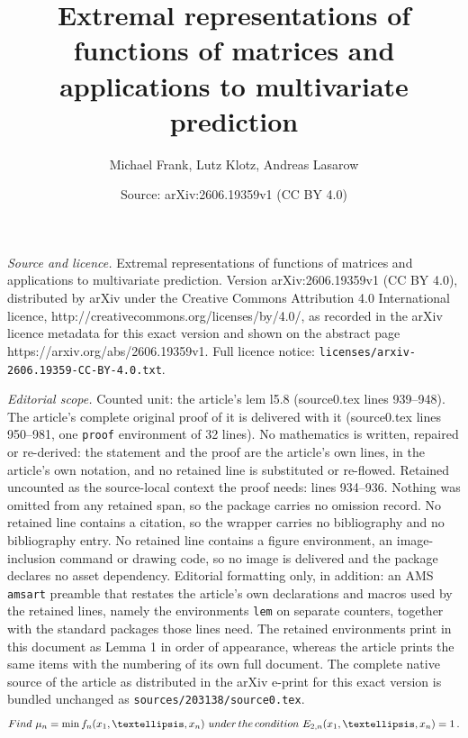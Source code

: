 \documentclass[10pt,a4paper]{amsart}
\title{Extremal representations of functions of matrices and applications to multivariate prediction}
\author{Michael Frank, Lutz Klotz, Andreas Lasarow}
\date{Source: arXiv:2606.19359v1 (CC BY 4.0)}
\begin{document}
\maketitle

\noindent\emph{Source and licence.} Extremal representations of functions of matrices and applications to multivariate prediction. Version arXiv:2606.19359v1 (CC BY 4.0), distributed by arXiv under the Creative Commons Attribution 4.0 International licence, http://creativecommons.org/licenses/by/4.0/, as recorded in the arXiv licence metadata for this exact version and shown on the abstract page https://arxiv.org/abs/2606.19359v1. Full licence notice: \texttt{licenses/arxiv-2606.19359-CC-BY-4.0.txt}.\par\smallskip

\noindent\textit{Editorial scope.} Counted unit: the article's lem l5.8 (source0.tex lines 939--948). The article's complete original proof of it is delivered with it (source0.tex lines 950--981, one \texttt{proof} environment of 32 lines). No mathematics is written, repaired or re-derived: the statement and the proof are the article's own lines, in the article's own notation, and no retained line is substituted or re-flowed.  Retained uncounted as the source-local context the proof needs: lines 934--936.  Nothing was omitted from any retained span, so the package carries no omission record.  No retained line contains a citation, so the wrapper carries no bibliography and no bibliography entry.  No retained line contains a figure environment, an image-inclusion command or drawing code, so no image is delivered and the package declares no asset dependency.  Editorial formatting only, in addition: an AMS \texttt{amsart} preamble that restates the article's own declarations and macros used by the retained lines, namely the environments \texttt{lem} on separate counters, together with the standard packages those lines need.  The retained environments print in this document as Lemma 1 in order of appearance, whereas the article prints the same items with the numbering of its own full document.  The complete native source of the article as distributed in the arXiv e-print for this exact version is bundled unchanged as \texttt{sources/203138/source0.tex}.
\begin{equation} \label{f5.16}
     {\rm Find} \,\, \mu_n = \min f_n(x_1,\ldots,x_n) \,\, {\rm under} \, {\rm the} \, {\rm condition} \,\, E_{2,n}(x_1,\ldots,x_n)=1 \, .
\end{equation}     
\end{document}
